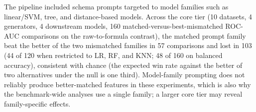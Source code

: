 The pipeline included schema prompts targeted to model families such as linear/SVM, tree, and distance-based models. Across the core tier (10 datasets, 4 generators, 4 downstream models, 160 matched-versus-best-mismatched ROC-AUC comparisons on the raw-to-formula contrast), the matched prompt family beat the better of the two mismatched families in 57 comparisons and lost in 103 (44 of 120 when restricted to LR, RF, and KNN; 48 of 160 on balanced accuracy), consistent with chance (the expected win rate against the better of two alternatives under the null is one third). Model-family prompting does not reliably produce better-matched features in these experiments, which is also why the benchmark-wide analyses use a single family; a larger core tier may reveal family-specific effects.

